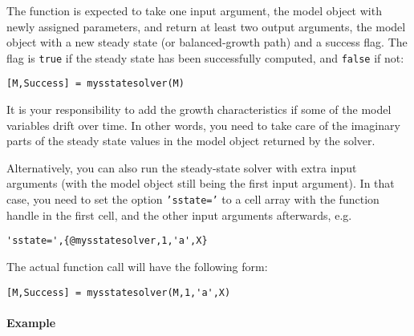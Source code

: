 The function is expected to take one input argument, the model object
with newly assigned parameters, and return at least two output
arguments, the model object with a new steady state (or balanced-growth
path) and a success flag. The flag is \texttt{true} if the steady state
has been successfully computed, and \texttt{false} if not:

\begin{verbatim}
[M,Success] = mysstatesolver(M)
\end{verbatim}

It is your responsibility to add the growth characteristics if some of
the model variables drift over time. In other words, you need to take
care of the imaginary parts of the steady state values in the model
object returned by the solver.

Alternatively, you can also run the steady-state solver with extra input
arguments (with the model object still being the first input argument).
In that case, you need to set the option \texttt{'sstate='} to a cell
array with the function handle in the first cell, and the other input
arguments afterwards, e.g.

\begin{verbatim}
'sstate=',{@mysstatesolver,1,'a',X}
\end{verbatim}

The actual function call will have the following form:

\begin{verbatim}
[M,Success] = mysstatesolver(M,1,'a',X)
\end{verbatim}

\paragraph{Example}


